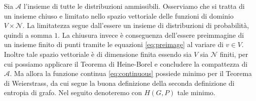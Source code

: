 Sia \(\mathcal{A}\) l'insieme di tutte le distribuzioni ammissibili. Osserviamo che si tratta di un insieme chiuso e limitato nello spazio vettoriale delle funzioni di dominio \(V\times \mathcal{N}\). La limitatezza segue dall'essere un insieme di distribuzioni di probabilità, quindi a somma \(1\). La chiusura invece è conseguenza dell'essere preimmagine di un insieme finito di punti tramite le equazioni \eqref{eq:preimage} al variare di \(v\in V\). Inoltre tale spazio vettoriale è di dimensione finita essendo sia \(V\) sia \(\mathcal{N}\) finiti, per cui possiamo applicare il Teorema di Heine-Borel e concludere la compattezza di \(\mathcal{A}\). Ma allora la funzione continua \eqref{eq:continuous} possiede minimo per il Teorema di Weierstrass, da cui segue la buona definizione della seconda definizione di entropia di grafo. Nel seguito denoteremo con \(H(G,P)\) tale minimo.

